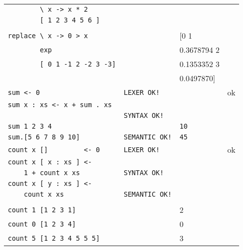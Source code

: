 \begin{longtable}[ht!]{|l|l|l|c|}
            \verb,        \ x -> x * 2,         &                    & & \\
            \verb,        [ 1 2 3 4 5 6 ],      &                    & & \\
                                                &                    & & \\
            \verb,replace \ x -> 0 > x,         &                    & [0 1 & \\
            \verb,        exp,                  &                    &  0.3678794 2& \\
            \verb,        [ 0 1 -1 2 -2 3 -3],  &                    &  0.1353352 3& \\
                                                &                    &  0.0497870]& \\ \hline

            \pagebreak

            \verb,sum <- 0,                  & \verb,LEXER OK!,   &                 & ok \\
            \verb,sum x : xs <- x + sum . xs,&                    &                 & \\
                                             & \verb,SYNTAX OK!,  &                 & \\
            \verb,sum 1 2 3 4,               &                    & \verb,10,       & \\
            \verb,sum.[5 6 7 8 9 10],        & \verb,SEMANTIC OK!,& \verb,45,       & \\ \hline

            \verb,count x []         <- 0,  & \verb,LEXER OK!,   & & ok \\
            \verb,count x [ x : xs ] <-,    &                    & & \\
            \verb,    1 + count x xs,       & \verb,SYNTAX OK!,  & & \\
            \verb,count x [ y : xs ] <-,    &                    & & \\
            \verb,    count x xs,           & \verb,SEMANTIC OK!,& & \\
                                            &                    & & \\
            \verb,count 1 [1 2 3 1],        &                    & 2 & \\
            \verb,count 0 [1 2 3 4],        &                    & 0 & \\
            \verb,count 5 [1 2 3 4 5 5 5],  &                    & 3 & \\ \hline


\end{longtable}
